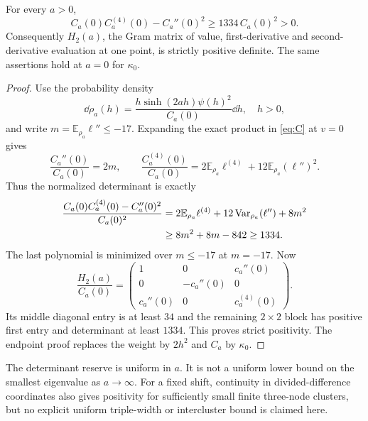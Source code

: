 \begin{theorem}\label{thm:three}
For every $a>0$,
\begin{equation}\label{eq:tripleDet}
\boxed{C_a(0)C_a^{(4)}(0)-C_a''(0)^2\ge1334\,C_a(0)^2>0.}
\end{equation}
Consequently $H_2(a)$, the Gram matrix of value, first-derivative and second-derivative evaluation at one point, is strictly positive definite. The same assertions hold at $a=0$ for $\kappa_0$.
\end{theorem}
\begin{proof}
Use the probability density
\[
\dd\rho_a(h)=\frac{h\sinh(2ah)\psi(h)^2}{C_a(0)}\dd h,
\quad h>0,
\]
and write $m=\mathbb E_{\rho_a}\ell''\le-17$. Expanding the exact product in \eqref{eq:C} at $v=0$ gives
\[
\frac{C_a''(0)}{C_a(0)}=2m,\qquad
\frac{C_a^{(4)}(0)}{C_a(0)}
=2\mathbb E_{\rho_a}\ell^{(4)}+12\mathbb E_{\rho_a}(\ell'')^2.
\]
Thus the normalized determinant is exactly
\begin{align}
\frac{C_a(0)C_a^{(4)}(0)-C_a''(0)^2}{C_a(0)^2}
&=2\mathbb E_{\rho_a}\ell^{(4)}
+12\operatorname{Var}_{\rho_a}(\ell'')+8m^2\notag\\
&\ge8m^2+8m-842\ge1334.\label{eq:tripleProof}
\end{align}
The last polynomial is minimized over $m\le-17$ at $m=-17$. Now
\[
\frac{H_2(a)}{C_a(0)}=
\begin{pmatrix}
1&0&c_a''(0)\\
0&-c_a''(0)&0\\
c_a''(0)&0&c_a^{(4)}(0)
\end{pmatrix}.
\]
Its middle diagonal entry is at least $34$ and the remaining $2\times2$ block has positive first entry and determinant at least $1334$. This proves strict positivity. The endpoint proof replaces the weight by $2h^2$ and $C_a$ by $\kappa_0$.
\end{proof}

The determinant reserve is uniform in $a$. It is not a uniform lower bound on the smallest eigenvalue as $a\to\infty$. For a fixed shift, continuity in divided-difference coordinates also gives positivity for sufficiently small finite three-node clusters, but no explicit uniform triple-width or intercluster bound is claimed here.

